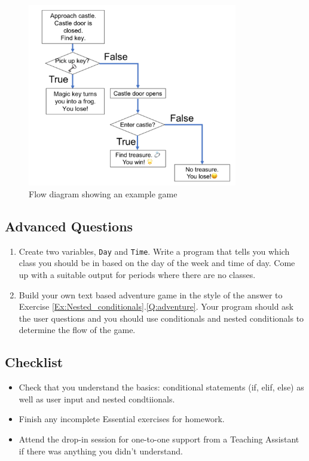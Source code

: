 \documentclass[11pt]{report}
\begin{document}
\begin{figure}[h]
        \centering
        \includegraphics[height=8cm]{adventure}
        \caption{Flow diagram showing an example game}
        \label{fig:adventure}
\end{figure}


\subsection*{Advanced Questions}

\begin{enumerate}[label=(\Alph*)]

    \item Create two variables, {\tt Day} and {\tt Time}. Write a program that tells you which class you should be in based on the day of the week and time of day. Come up with a suitable output for periods where there are no classes. 
    
    \item Build your own text based adventure game in the style of the answer to Exercise \ref{Ex:Nested_conditionals}.\ref{Q:adventure}. Your program should ask the user questions and you should use conditionals and nested conditionals to determine the flow of the game. 
    
\end{enumerate}



\subsection*{Checklist}
\begin{itemize}
	\item Check that you understand the basics: conditional statements (if, elif, else) as well as user input and nested condtiionals.
	\item Finish any incomplete Essential exercises for homework. 
	\item Attend the drop-in session for one-to-one support from a Teaching Assistant if there was anything you didn't understand.
\end{itemize}
\end{document}

